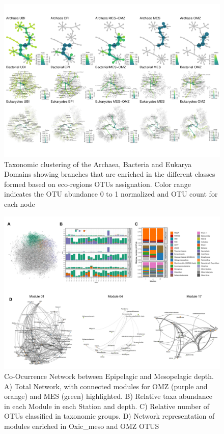 \documentclass[fleqn,10pt]{wlscirep}
\begin{document}
\begin{figure}[ht]
    \centering
    \includegraphics[scale=0.7,angle=90,origin=c]{images/hmap_general_pub.pdf}
    \caption{Taxonomic clustering of the Archaea, Bacteria and Eukarya Domains showing branches that are enriched in the different classes formed based on eco-regions OTUs assignation. Color range indicates the OTU abundance 0 to 1 normalized and OTU count for each node}
    \label{fig:tax_trees}
\end{figure}
\clearpage
\begin{figure}[ht]
    \centering
    \includegraphics[scale=0.5]{images/Networks_Composite_v3.pdf}
    \caption{Co-Ocurrence Network between Epipelagic and Mesopelagic depth. A) Total Network, with connected modules for OMZ (purple and orange) and MES (green) highlighted. B) Relative taxa abundance in each Module in each Station and depth. C) Relative number of OTUs classified in taxonomic groups. D) Network representation of modules enriched in Oxic\_meso and OMZ OTUS}
    \label{fig:networks}
\end{figure}
\clearpage
\end{document}
